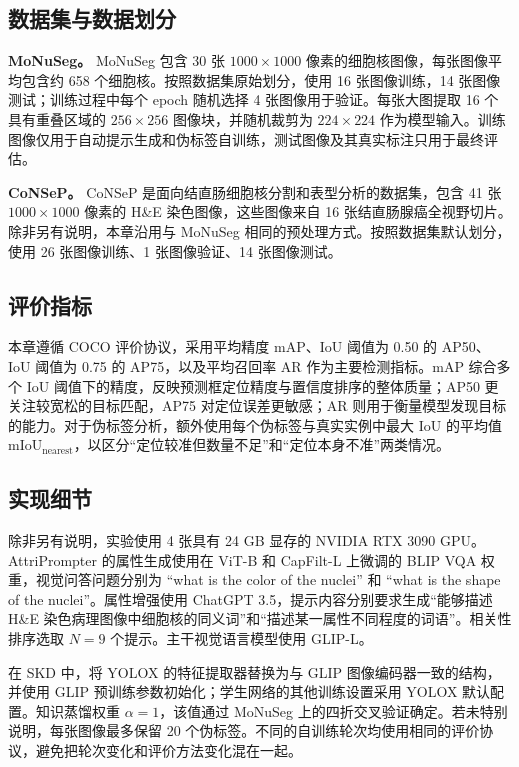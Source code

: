 \subsection{数据集与数据划分}

\textbf{MoNuSeg。} MoNuSeg 包含 30 张 $1000\times1000$ 像素的细胞核图像，每张图像平均包含约 658 个细胞核。按照数据集原始划分，使用 16 张图像训练，14 张图像测试；训练过程中每个 epoch 随机选择 4 张图像用于验证。每张大图提取 16 个具有重叠区域的 $256\times256$ 图像块，并随机裁剪为 $224\times224$ 作为模型输入。训练图像仅用于自动提示生成和伪标签自训练，测试图像及其真实标注只用于最终评估。

\textbf{CoNSeP。} CoNSeP 是面向结直肠细胞核分割和表型分析的数据集，包含 41 张 $1000\times1000$ 像素的 H\&E 染色图像，这些图像来自 16 张结直肠腺癌全视野切片。除非另有说明，本章沿用与 MoNuSeg 相同的预处理方式。按照数据集默认划分，使用 26 张图像训练、1 张图像验证、14 张图像测试。

\subsection{评价指标}

本章遵循 COCO 评价协议，采用平均精度 mAP、IoU 阈值为 0.50 的 AP50、IoU 阈值为 0.75 的 AP75，以及平均召回率 AR 作为主要检测指标。mAP 综合多个 IoU 阈值下的精度，反映预测框定位精度与置信度排序的整体质量；AP50 更关注较宽松的目标匹配，AP75 对定位误差更敏感；AR 则用于衡量模型发现目标的能力。对于伪标签分析，额外使用每个伪标签与真实实例中最大 IoU 的平均值 $\mathrm{mIoU}_{\mathrm{nearest}}$，以区分“定位较准但数量不足”和“定位本身不准”两类情况。

\subsection{实现细节}

除非另有说明，实验使用 4 张具有 24 GB 显存的 NVIDIA RTX 3090 GPU。AttriPrompter 的属性生成使用在 ViT-B 和 CapFilt-L 上微调的 BLIP VQA 权重，视觉问答问题分别为 ``what is the color of the nuclei'' 和 ``what is the shape of the nuclei''。属性增强使用 ChatGPT 3.5，提示内容分别要求生成“能够描述 H\&E 染色病理图像中细胞核的同义词”和“描述某一属性不同程度的词语”。相关性排序选取 $N=9$ 个提示。主干视觉语言模型使用 GLIP-L。

在 SKD 中，将 YOLOX 的特征提取器替换为与 GLIP 图像编码器一致的结构，并使用 GLIP 预训练参数初始化；学生网络的其他训练设置采用 YOLOX 默认配置。知识蒸馏权重 $\alpha=1$，该值通过 MoNuSeg 上的四折交叉验证确定。若未特别说明，每张图像最多保留 20 个伪标签。不同的自训练轮次均使用相同的评价协议，避免把轮次变化和评价方法变化混在一起。

